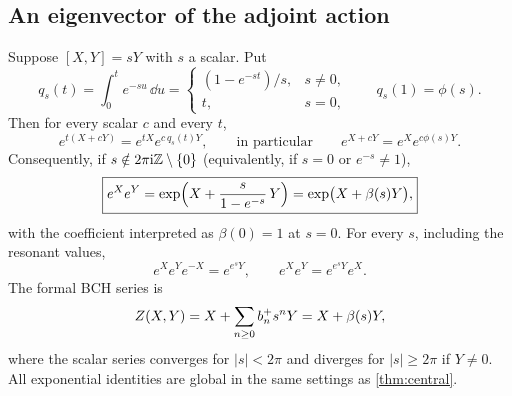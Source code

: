 \subsection{An eigenvector of the adjoint action}
\begin{theorem}[{The relation $[X,Y]=sY$}]\label{thm:eigen}
Suppose $[X,Y]=sY$ with $s$ a scalar. Put
\[
 q_s(t)=\int_0^te^{-su}\,\dd u=\begin{cases}(1-e^{-st})/s,&s\neq0,\\ t,&s=0,\end{cases}
 \qquad q_s(1)=\phi(s).
\]
Then for every scalar $c$ and every $t$,
\begin{equation}\label{eq:eigenfactor}
 e^{t(X+cY)}=e^{tX}e^{c\,q_s(t)Y},\qquad\text{in particular}\qquad
 e^{X+cY}=e^Xe^{c\phi(s)Y}.
\end{equation}
Consequently, if $s\notin2\pi\mathrm{i}\mathbb{Z}\setminus\{0\}$ (equivalently, if $s=0$
or $e^{-s}\neq1$),
\begin{equation}\label{eq:eigenbch}
 \boxed{\displaystyle e^Xe^Y=\exp\Bigl(X+\frac{s}{1-e^{-s}}\,Y\Bigr)
 =\exp\bigl(X+\beta(s)Y\bigr),}
\end{equation}
with the coefficient interpreted as $\beta(0)=1$ at $s=0$. For every $s$,
including the resonant values,
\begin{equation}\label{eq:eigenbraid}
 e^Xe^Ye^{-X}=e^{e^sY},\qquad e^Xe^Y=e^{e^sY}e^X.
\end{equation}
The formal BCH series is
\begin{equation}\label{eq:eigenseries}
 Z(X,Y)=X+\sum_{n\geq0}b^{+}_{n}s^nY=X+\beta(s)Y,
\end{equation}
where the scalar series converges for $|s|<2\pi$ and diverges for
$|s|\geq2\pi$ if $Y\neq0$. All exponential identities are global in the
same settings as \cref{thm:central}.
\end{theorem}

